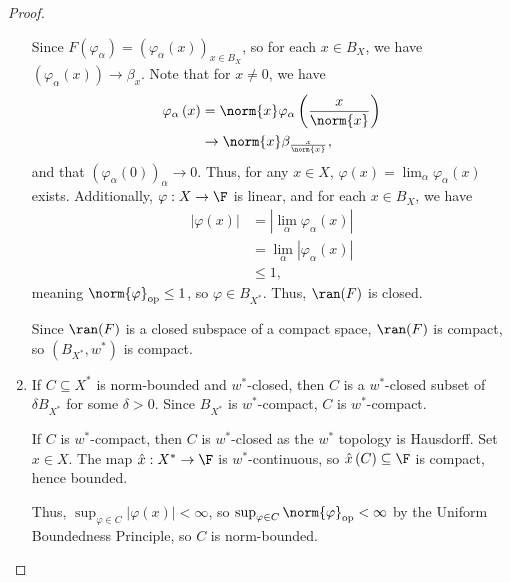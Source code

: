 \documentclass[10pt]{mypackage}
\begin{document}
\begin{proof}
\begin{enumerate}[(1)]
      Since $F\left(\varphi_{\alpha}\right) = \left(\varphi_{\alpha}(x)\right)_{x\in B_X}$, so for each $x\in B_X$, we have $\left(\varphi_{\alpha}\left(x\right)\right) \rightarrow \beta_x$. Note that for $x\neq 0$, we have
      \begin{align*}
        \varphi_{\alpha}\left(x\right) &= \norm{x}\varphi_{\alpha}\left(\frac{x}{\norm{x}}\right)\\
                                       &\rightarrow \norm{x}\beta_{\frac{x}{\norm{x}}},
      \end{align*}
      and that $\left(\varphi_{\alpha}(0)\right)_{\alpha}\rightarrow 0$. Thus, for any $x\in X$, $\varphi(x) = \lim_{\alpha}\varphi_{\alpha}(x)$ exists. Additionally, $\varphi: X\rightarrow \F$ is linear, and for each $x\in B_X$, we have
      \begin{align*}
        \left\vert \varphi(x) \right\vert &= \left\vert \lim_{\alpha}\varphi_{\alpha}(x) \right\vert\\
                                          &=\lim_{\alpha}\left\vert \varphi_{\alpha}\left(x\right) \right\vert\\
                                          &\leq 1,
      \end{align*}
      meaning $\norm{\varphi}_{\text{op}} \leq 1$, so $\varphi\in B_{X^{\ast}}$. Thus, $\ran(F)$ is closed.\newline

      Since $\ran(F)$ is a closed subspace of a compact space, $\ran(F)$ is compact, so $\left(B_{X^{\ast}},w^{\ast}\right)$ is compact.
    \item If $C\subseteq X^{\ast}$ is norm-bounded and $w^{\ast}$-closed, then $C$ is a $w^{\ast}$-closed subset of $\delta B_{X^{\ast}}$ for some $\delta > 0$. Since $B_{X^{\ast}}$ is $w^{\ast}$-compact, $C$ is $w^{\ast}$-compact.\newline

      If $C$ is $w^{\ast}$-compact, then $C$ is $w^{\ast}$-closed as the $w^{\ast}$ topology is Hausdorff. Set $x\in X$. The map $\hat{x}:X^{\ast}\rightarrow \F$ is $w^{\ast}$-continuous, so $\hat{x}\left(C\right)\subseteq \F$ is compact, hence bounded.\newline

      Thus, $\sup_{\varphi\in C}\left\vert \varphi(x) \right\vert < \infty$, so $\sup_{\varphi\in C}\norm{\varphi}_{\text{op}} < \infty$ by the Uniform Boundedness Principle, so $C$ is norm-bounded.
  \end{enumerate}
\end{proof}
\end{document}
